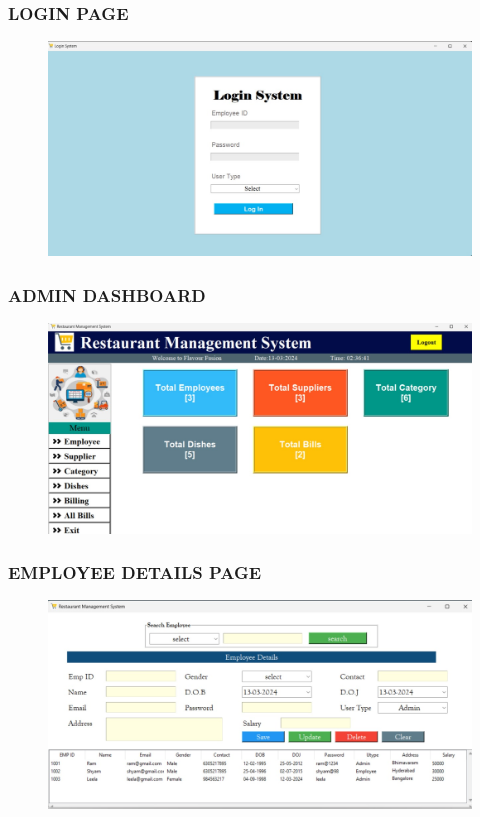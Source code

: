 \documentclass{beamer}
\begin{document}
\begin{frame}
  \frametitle{LOGIN PAGE}
  \begin{figure}
    \centering
    \includegraphics[width=1.0\textwidth]{loginpage.jpg}
  \end{figure}
\end{frame}

\begin{frame}
  \frametitle{ADMIN DASHBOARD}
  \begin{figure}
    \centering
    \includegraphics[width=1\linewidth]{admindashboard.jpg} 
  \end{figure}
\end{frame}


\begin{frame}
  \frametitle{EMPLOYEE DETAILS PAGE}
  \begin{figure}
    \centering
    \includegraphics[width=1.0\linewidth]{employeedetailspage.jpg} 
  \end{figure}
\end{frame}
\end{document}
